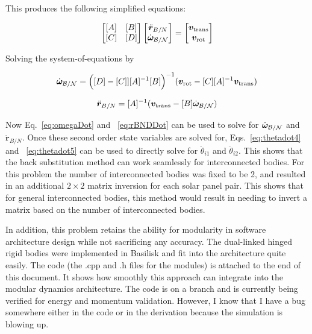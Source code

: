 \documentclass[paper]{aiaaNew}
\begin{document}
This produces the following simplified equations:

	\begin{equation}
\begin{bmatrix}
[A] & [B]\\
[C] & [D]
\end{bmatrix} \begin{bmatrix}
\ddot{\bm r}_{B/N}\\
\dot{\bm\omega}_{\cal B/N}
\end{bmatrix} = \begin{bmatrix}
\bm v_{\text{trans}}\\
\bm v_{\text{rot}}
\end{bmatrix}
\end{equation}

Solving the system-of-equations by

\begin{equation}
\dot{\bm\omega}_{\cal B/N} = \Big([D] - [C]][A]^{-1}[B]\Big)^{-1}(\bm v_{\text{rot}} - [C][A]^{-1}\bm v_{\text{trans}})
\label{eq:omegaDot}
\end{equation}

\begin{equation}
\ddot{\bm r}_{B/N} = [A]^{-1} (\bm v_{\text{trans}} - [B]\dot{\bm\omega}_{\cal B/N})
\label{eq:rBNDDot}
\end{equation}
	
	Now Eq.~\eqref{eq:omegaDot} and ~\eqref{eq:rBNDDot} can be used to solve for $\dot{\bm\omega}_{\cal B/N}$ and $\ddot{\bm r}_{B/N}$. Once these second order state variables are solved for, Eqs.~\eqref{eq:thetadot4} and ~\eqref{eq:thetadot5} can be used to directly solve for $\ddot \theta_{i1}$ and $\ddot \theta_{i2}$. This shows that the back substitution method can work seamlessly for interconnected bodies. For this problem the number of interconnected bodies was fixed to be 2, and resulted in an additional $2\times 2$ matrix inversion for each solar panel pair. This shows that for general interconnected bodies, this method would result in needing to invert a matrix based on the number of interconnected bodies. 
	
	In addition, this problem retains the ability for modularity in software architecture design while not sacrificing any accuracy. The dual-linked hinged rigid bodies were implemented in Basilisk and fit into the architecture quite easily. The code (the .cpp and .h files for the modules) is attached to the end of this document. It shows how smoothly this approach can integrate into the modular dynamics architecture. The code is on a branch and is currently being verified for energy and momentum validation. However, I know that I have a bug somewhere either in the code or in the derivation because the simulation is blowing up. 
		
\end{document}

